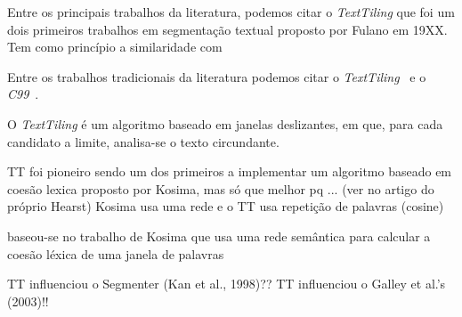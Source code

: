 











Entre os principais trabalhos da literatura, podemos citar o \textit{TextTiling} que foi um dois primeiros trabalhos em segmentação textual proposto por Fulano em 19XX. Tem como princípio a similaridade com







Entre os trabalhos tradicionais da literatura podemos citar o  \textit{TextTiling}~\cite{Hearst1994} e o \textit{C99}~\cite{Choi2000}. 

O \textit{TextTiling} é um algoritmo baseado em janelas deslizantes, em  que, para cada candidato a limite, analisa-se o texto circundante.



TT foi pioneiro sendo um dos primeiros a implementar um algoritmo baseado em coesão lexica proposto por Kosima, mas só que melhor pq ... (ver no artigo do próprio Hearst)
Kosima usa uma rede e o TT usa repetição de palavras (cosine)

baseou-se no trabalho de Kosima que usa uma rede semântica para calcular a coesão léxica de uma janela de palavras  


TT influenciou o Segmenter (Kan et al., 1998)??
TT influenciou o Galley et al.’s (2003)!!



